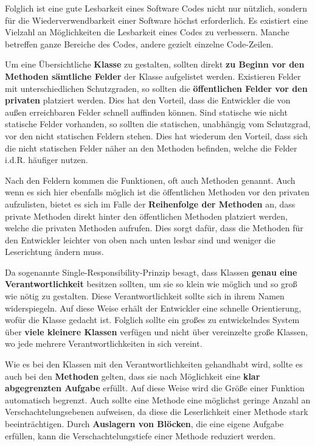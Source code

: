 \documentclass[utf8,biblatex]{lni}
\begin{document}
Folglich ist eine gute Lesbarkeit eines Software Codes nicht nur nützlich, sondern für die Wiederverwendbarkeit einer Software höchst erforderlich. Es existiert eine Vielzahl an Möglichkeiten die Lesbarkeit eines Codes zu verbessern. Manche betreffen ganze Bereiche des Codes, andere gezielt einzelne Code-Zeilen.


Um eine Übersichtliche \textbf{Klasse} zu gestalten, sollten direkt \textbf{zu Beginn vor den Methoden sämtliche Felder} der Klasse aufgelistet werden. Existieren Felder mit unterschiedlichen Schutzgraden, so sollten die \textbf{öffentlichen Felder vor den privaten} platziert werden. Dies hat den Vorteil, dass die Entwickler die von außen erreichbaren Felder schnell auffinden können. Sind statische wie nicht statische Felder vorhanden, so sollten die statischen, unabhängig vom Schutzgrad, vor den nicht statischen Feldern stehen. Dies hat wiederum den Vorteil, dass sich die nicht statischen Felder näher an den Methoden befinden, welche die Felder i.d.R. häufiger nutzen.

Nach den Feldern kommen die Funktionen, oft auch Methoden genannt. Auch wenn es sich hier ebenfalls möglich ist die öffentlichen Methoden vor den privaten aufzulisten, bietet es sich im Falle der \textbf{Reihenfolge der Methoden} an, dass private Methoden direkt hinter den öffentlichen Methoden platziert werden, welche die privaten Methoden aufrufen. Dies sorgt dafür, dass die Methoden für den Entwickler leichter von oben nach unten lesbar sind und weniger die Leserichtung ändern muss.

Da sogenannte Single-Responsibility-Prinzip besagt, dass Klassen \textbf{genau eine Verantwortlichkeit} besitzen sollten, um sie so klein wie möglich und so groß wie nötig zu gestalten. Diese Verantwortlichkeit sollte sich in ihrem Namen widerspiegeln. Auf diese Weise erhält der Entwickler eine schnelle Orientierung, wofür die Klasse gedacht ist. Folglich sollte ein großes zu entwickelndes System über \textbf{viele kleinere Klassen} verfügen und nicht über vereinzelte große Klassen, wo jede mehrere Verantwortlichkeiten in sich vereint.


Wie es bei den Klassen mit den Verantwortlichkeiten gehandhabt wird, sollte es auch bei den \textbf{Methoden} gelten, dass sie nach Möglichkeit eine \textbf{klar abgegrenzten Aufgabe} erfüllt. Auf diese Weise wird die Größe einer Funktion automatisch begrenzt. Auch sollte eine Methode eine möglichst geringe Anzahl an Verschachtelungsebenen aufweisen, da diese die Leserlichkeit einer Methode stark beeinträchtigen. Durch \textbf{Auslagern von Blöcken}, die eine eigene Aufgabe erfüllen, kann die Verschachtelungstiefe einer Methode reduziert werden.
\end{document}

